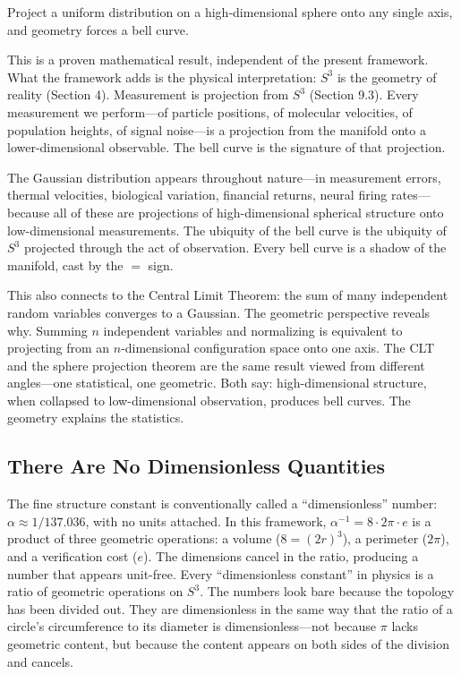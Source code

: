 \documentclass[12pt]{article}
\begin{document}
\medskip
Project a uniform distribution on a high-dimensional sphere onto any single axis, and geometry forces a bell curve.

This is a proven mathematical result, independent of the present framework. What the framework adds is the physical interpretation: $S^3$ is the geometry of reality (Section 4). Measurement is projection from $S^3$ (Section 9.3). Every measurement we perform---of particle positions, of molecular velocities, of population heights, of signal noise---is a projection from the manifold onto a lower-dimensional observable. The bell curve is the signature of that projection.

The Gaussian distribution appears throughout nature---in measurement errors, thermal velocities, biological variation, financial returns, neural firing rates---because all of these are projections of high-dimensional spherical structure onto low-dimensional measurements. The ubiquity of the bell curve is the ubiquity of $S^3$ projected through the act of observation. Every bell curve is a shadow of the manifold, cast by the $=$ sign.

This also connects to the Central Limit Theorem: the sum of many independent random variables converges to a Gaussian. The geometric perspective reveals why. Summing $n$ independent variables and normalizing is equivalent to projecting from an $n$-dimensional configuration space onto one axis. The CLT and the sphere projection theorem are the same result viewed from different angles---one statistical, one geometric. Both say: high-dimensional structure, when collapsed to low-dimensional observation, produces bell curves. The geometry explains the statistics.

\subsection{There Are No Dimensionless Quantities}

The fine structure constant is conventionally called a ``dimensionless'' number: $\alpha \approx 1/137.036$, with no units attached. In this framework, $\alpha^{-1} = 8 \cdot 2\pi \cdot e$ is a product of three geometric operations: a volume ($8 = (2r)^3$), a perimeter ($2\pi$), and a verification cost ($e$). The dimensions cancel in the ratio, producing a number that appears unit-free. Every ``dimensionless constant'' in physics is a ratio of geometric operations on $S^3$. The numbers look bare because the topology has been divided out. They are dimensionless in the same way that the ratio of a circle's circumference to its diameter is dimensionless---not because $\pi$ lacks geometric content, but because the content appears on both sides of the division
and cancels.
\end{document}
